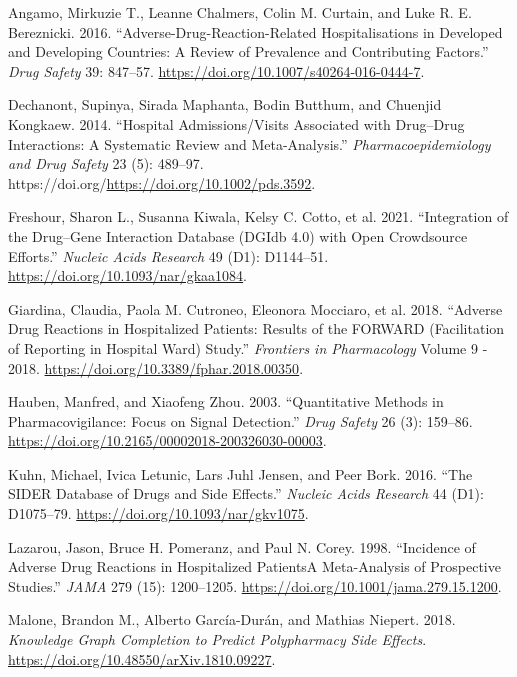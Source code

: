 \documentclass{article}
\newlength{\cslhangindent}
\newenvironment{CSLReferences}[2] %
 {\begin{list}{}{%
  \setlength{\itemindent}{0pt}
  \setlength{\leftmargin}{0pt}
  \setlength{\parsep}{0pt}
  \ifodd #1
   \setlength{\leftmargin}{\cslhangindent}
   \setlength{\itemindent}{-1\cslhangindent}
  \fi
  \setlength{\itemsep}{#2\baselineskip}}}
 {\end{list}}
\begin{document}
\protect{}\label{refs}
\begin{CSLReferences}{1}{1}
Angamo, Mirkuzie T., Leanne Chalmers, Colin M. Curtain, and Luke R. E.
Bereznicki. 2016. {``Adverse-Drug-Reaction-Related Hospitalisations in
Developed and Developing Countries: A Review of Prevalence and
Contributing Factors.''} \emph{Drug Safety} 39: 847--57.
\url{https://doi.org/10.1007/s40264-016-0444-7}.

Dechanont, Supinya, Sirada Maphanta, Bodin Butthum, and Chuenjid
Kongkaew. 2014. {``Hospital Admissions/Visits Associated with Drug--Drug
Interactions: A Systematic Review and Meta-Analysis.''}
\emph{Pharmacoepidemiology and Drug Safety} 23 (5): 489--97.
https://doi.org/\url{https://doi.org/10.1002/pds.3592}.

{Freshour, Sharon L., Susanna Kiwala, Kelsy C. Cotto, et al.} 2021.
{``Integration of the Drug--Gene Interaction Database (DGIdb 4.0) with
Open Crowdsource Efforts.''} \emph{Nucleic Acids Research} 49 (D1):
D1144--51. \url{https://doi.org/10.1093/nar/gkaa1084}.

Giardina, Claudia, Paola M. Cutroneo, Eleonora Mocciaro, et al. 2018.
{``Adverse Drug Reactions in Hospitalized Patients: Results of the
FORWARD (Facilitation of Reporting in Hospital Ward) Study.''}
\emph{Frontiers in Pharmacology} Volume 9 - 2018.
\url{https://doi.org/10.3389/fphar.2018.00350}.

Hauben, Manfred, and Xiaofeng Zhou. 2003. {``Quantitative Methods in
Pharmacovigilance: Focus on Signal Detection.''} \emph{Drug Safety} 26
(3): 159--86. \url{https://doi.org/10.2165/00002018-200326030-00003}.

Kuhn, Michael, Ivica Letunic, Lars Juhl Jensen, and Peer Bork. 2016.
{``The SIDER Database of Drugs and Side Effects.''} \emph{Nucleic Acids
Research} 44 (D1): D1075--79. \url{https://doi.org/10.1093/nar/gkv1075}.

Lazarou, Jason, Bruce H. Pomeranz, and Paul N. Corey. 1998. {``Incidence
of Adverse Drug Reactions in Hospitalized PatientsA Meta-Analysis of
Prospective Studies.''} \emph{JAMA} 279 (15): 1200--1205.
\url{https://doi.org/10.1001/jama.279.15.1200}.

Malone, Brandon M., Alberto García-Durán, and Mathias Niepert. 2018.
\emph{Knowledge Graph Completion to Predict Polypharmacy Side Effects}.
\url{https://doi.org/10.48550/arXiv.1810.09227}.


\end{CSLReferences}
\end{document}
